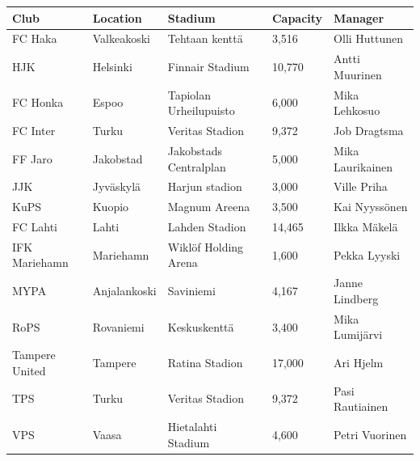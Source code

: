 \documentclass{article}
\begin{document}
\begin{tabular}{lllll}
\toprule
Club & Location & Stadium & Capacity & Manager \\
\midrule
FC Haka & Valkeakoski & Tehtaan kenttä & 3,516 & Olli Huttunen \\
HJK & Helsinki & Finnair Stadium & 10,770 & Antti Muurinen \\
FC Honka & Espoo & Tapiolan Urheilupuisto & 6,000 & Mika Lehkosuo \\
FC Inter & Turku & Veritas Stadion & 9,372 & Job Dragtsma \\
FF Jaro & Jakobstad & Jakobstads Centralplan & 5,000 & Mika Laurikainen \\
JJK & Jyväskylä & Harjun stadion & 3,000 & Ville Priha \\
KuPS & Kuopio & Magnum Areena & 3,500 & Kai Nyyssönen \\
FC Lahti & Lahti & Lahden Stadion & 14,465 & Ilkka Mäkelä \\
IFK Mariehamn & Mariehamn & Wiklöf Holding Arena & 1,600 & Pekka Lyyski \\
MYPA & Anjalankoski & Saviniemi & 4,167 & Janne Lindberg \\
RoPS & Rovaniemi & Keskuskenttä & 3,400 & Mika Lumijärvi \\
Tampere United & Tampere & Ratina Stadion & 17,000 & Ari Hjelm \\
TPS & Turku & Veritas Stadion & 9,372 & Pasi Rautiainen \\
VPS & Vaasa & Hietalahti Stadium & 4,600 & Petri Vuorinen \\
\bottomrule
\end{tabular}
\end{document}
